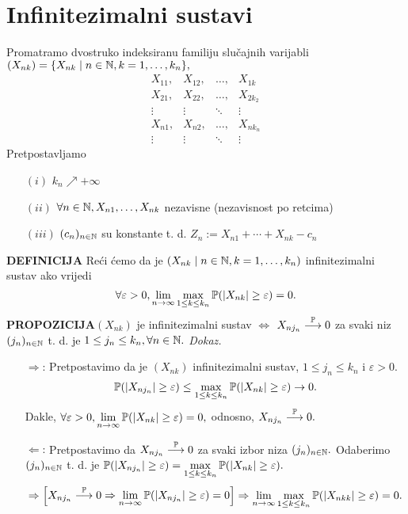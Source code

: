 \documentclass{article}
\begin{document}
\section{Infinitezimalni sustavi}
Promatramo dvostruko indeksiranu familiju slučajnih varijabli \((X_{nk})=\{X_{nk}\mid n\in\Bbb N,k=1,\ldots,k_n\},\) \[\begin{matrix}X_{11},&X_{12},&\ldots,&X_{1k}\\X_{21},&X_{22},&\ldots,&X_{2k_2}\\\vdots&\vdots&\ddots&\vdots\\X_{n1},&X_{n2},&\ldots,&X_{nk_n}\\\vdots&\vdots&\ddots&\vdots\end{matrix}\] Pretpostavljamo 
\begin{enumerate}
    \item[\((i)\)] \(k_n\nearrow+\infty\)
    \item[\((ii)\)] \(\forall n\in\Bbb N, X_{n1},\ldots,X_{nk}\) nezavisne (nezavisnost po retcima)
    \item[\((iii)\)] \((c_n)_{n\in\Bbb N}\) su konstante t. d. \(Z_n:=X_{n1}+\cdots+X_{nk}-c_n\)
\end{enumerate}
\textbf{DEFINICIJA}\newline 
Reći ćemo da je \((X_{nk}\mid n\in\Bbb N,k=1,\ldots,k_n)\) infinitezimalni sustav ako vrijedi \[\forall\varepsilon>0,\lim_{n\to\infty}\max_{1\le k\le k_n}\Bbb P(|X_{nk}|\ge\varepsilon)=0.\]
\textbf{PROPOZICIJA}\newline \((X_{nk})\) je infinitezimalni sustav \(\Leftrightarrow\) \(X_{nj_n}\overset{\Bbb P}{\longrightarrow}0\) za svaki niz \((j_n)_{n\in\Bbb N}\) t. d. je \(1\le j_n\le k_n,\forall n\in\Bbb N.\)\newline\newline
\textit{Dokaz.}
\begin{enumerate}
    \item[\(\boxed{\Rightarrow}\):] Pretpostavimo da je \((X_{nk})\) infinitezimalni sustav, \(1\le j_n\le k_n\) i \(\varepsilon>0.\) \[\Bbb P(|X_{nj_n}|\ge\varepsilon)\le\max_{1\le k\le k_n}\Bbb P(|X_{nk}|\ge\varepsilon)\to 0.\] Dakle, \(\forall\varepsilon>0,\lim\limits_{n\to\infty}\Bbb P(|X_{nk}|\ge\varepsilon)=0,\) odnosno, \(X_{nj_n}\overset{\Bbb P}{\longrightarrow}0.\)
    \item[\(\boxed{\Leftarrow}\):] Pretpostavimo da \(X_{nj_n}\overset{\Bbb P}{\longrightarrow}0\) za svaki izbor niza \((j_n)_{n\in\Bbb N}.\) Odaberimo \((j_n)_{n\in\Bbb N}\) t. d. je \(\Bbb P(|X_{nj_n}|\ge\varepsilon)=\max\limits_{1\le k\le k_n}\Bbb P(|X_{nk}|\ge\varepsilon).\) \[\Rightarrow\begin{bmatrix}X_{nj_n}\overset{\Bbb P}{\longrightarrow}0\Rightarrow\lim\limits_{n\to\infty}\Bbb P(|X_{nj_n}|\ge\varepsilon)=0\end{bmatrix}\Rightarrow\lim_{n\to\infty}\max_{1\le k\le k_n}\Bbb P(|X_{nkk}|\ge\varepsilon)=0.\]
\end{enumerate}
\end{document}
